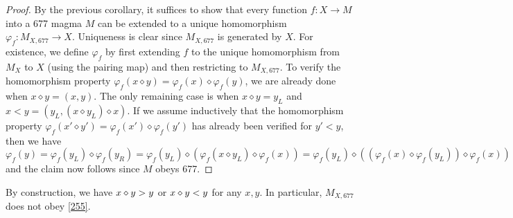 \begin{proof}  By the previous corollary, it suffices to show that every function $f: X \to M$ into a 677 magma $M$ can be extended to a unique homomorphism $\varphi_f: M_{X,677} \to X$. Uniqueness is clear since $M_{X,677}$ is generated by $X$.  For existence, we define $\varphi_f$ by first extending $f$ to the unique homomorphism from $M_X$ to $X$ (using the pairing map) and then restricting to $M_{X,677}$.  To verify the homomorphism property $\varphi_f(x \diamond y) = \varphi_f(x) \diamond \varphi_f(y)$, we are already done when $x \diamond y = (x,y)$. The only remaining case is when $x \diamond y = y_L$ and $x < y = (y_L,  (x \diamond y_L) \diamond x)$.   If we assume inductively that the homomorphism property $\varphi_f(x' \diamond y') = \varphi_f(x') \diamond \varphi_f(y')$ has already been verified for $y' < y$, then we have
  $$ \varphi_f(y) = \varphi_f(y_L) \diamond \varphi_f(y_R) = \varphi_f(y_L) \diamond (\varphi_f(x \diamond y_L) \diamond \varphi_f(x)) =  \varphi_f(y_L) \diamond ((\varphi_f(x) \diamond \varphi_f(y_L)) \diamond \varphi_f(x))$$
  and the claim now follows since $M$ obeys 677.
\end{proof}

By construction, we have $x \diamond y > y$ or $x \diamond y < y$ for any $x,y$.  In particular, $M_{X,677}$ does not obey \eqref{255}.

